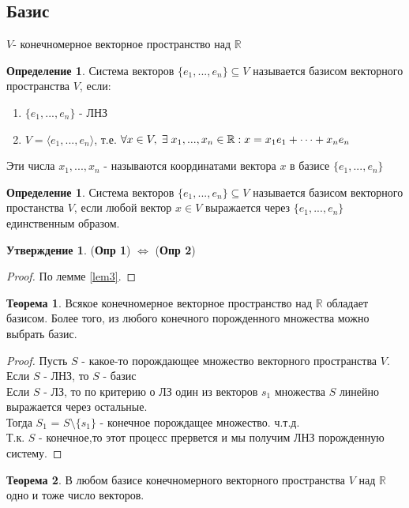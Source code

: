 \documentclass[a4paper, 12pt]{article}
\newcommand{\R}{\mathbb R}
\newcommand\tab[1][.5cm]{\hspace*{#1}}
\newcounter{defcount}
\theoremstyle{definition}
\newtheorem*{theorem}{Теорема}
\newtheorem*{subtheorem}{Утверждение}
\newtheorem{definitionnum}[defcount]{Определение}
\begin{document}
\subsection{Базис}
$V$- конечномерное векторное пространство над $\R$ 
\begin{definitionnum}
  Система векторов $\{e_1,...,e_n\}\subseteq V$ называется базисом векторного пространства $V$, если:
  \begin{enumerate}
    \item $\{e_1,...,e_n\}$ - ЛНЗ
    \item $V = \langle e_1,...,e_n \rangle$, т.е. $\forall x \in V, \tab[0.1cm] \exists \tab[0.1cm] x_1,...,x_n \in \R: x = x_1e_1+\cdots + x_ne_n$  
  \end{enumerate}
  Эти числа $x_1,...,x_n$ - называются координатами вектора $x$ в базисе $\{e_1,...,e_n\}$ 
\end{definitionnum} 
\begin{definitionnum}
  Система векторов $\{e_1,...,e_n\} \subseteq V$ называется базисом векторного простанства $V$, если любой вектор $x \in V$ выражается через $\{e_1,...,e_n\}$ единственным образом.
\end{definitionnum} 
  \begin{subtheorem}
    (\textbf{Опр 1}) $\Longleftrightarrow $ (\textbf{Опр 2})
  \end{subtheorem} 
  \begin{proof}
    По лемме \eqref{lem3}.
  \end{proof}
  \begin{theorem}
    Всякое конечномерное векторное пространство над $\R$ обладает базисом. Более того, из любого конечного порожденного множества можно выбрать базис.
  \end{theorem} 
  \begin{proof}
    Пусть $S$ - какое-то порождающее множество векторного пространства $V$. \\
    Если $S$ - ЛНЗ, то $S$ - базис \\
    Если $S$ - ЛЗ, то по критерию о ЛЗ один из векторов $s_1$ множества $S$ линейно выражается через остальные. \\
    Тогда $S_1$ = $S\setminus\{s_1\}$ - конечное порождащее множество. ч.т.д. \\
    Т.к. $S$ - конечное,то этот процесс прервется и мы получим ЛНЗ порожденную систему.
  \end{proof} 
  \begin{theorem}
    В любом базисе конечномерного векторного пространства $V$ над $\R$ одно и тоже число векторов.
  \end{theorem} 
\end{document}
